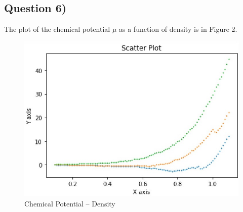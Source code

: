 \documentclass[11pt]{report}
\begin{document}
\subsection*{Question 6)}

The plot of the chemical potential $\mu$ as a function of density is in Figure 2.

\begin{figure}[ht!]
	\begin{center}
		\includegraphics[scale = 0.4]{Mu.jpeg}
		\caption{Chemical Potential -- Density}
	\end{center}
\end{figure}
\end{document}
